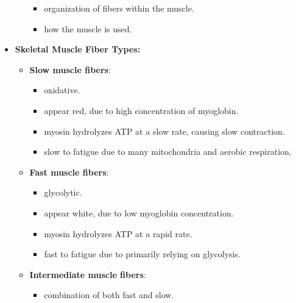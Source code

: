 \documentclass[12pt,a4paper]{article}
\begin{document}
\begin{itemize}
\begin{itemize}
\begin{itemize}
                        \item organization of fibers within the muscle.
                        \item how the muscle is used.
                    \end{itemize}
            \end{itemize}
        \item \textbf{Skeletal Muscle Fiber Types:}
            \begin{itemize}
                \item \textbf{Slow muscle fibers}:
                    \begin{itemize}
                        \item oxidative.
                        \item appear red, due to high concentration of myoglobin.
                        \item myosin hydrolyzes ATP at a slow rate, causing slow contraction.
                        \item slow to fatigue due to many mitochondria and aerobic respiration.
                    \end{itemize} 
                \item \textbf{Fast muscle fibers}:
                    \begin{itemize}
                        \item glycolytic.
                        \item appear white, due to low myoglobin concentration.
                        \item myosin hydrolyzes ATP at a rapid rate.
                        \item fast to fatigue due to primarily relying on glycolysis.
                    \end{itemize}
                \item \textbf{Intermediate muscle fibers}:
                    \begin{itemize}
                        \item combination of both fast and slow.
                    \end{itemize}
            \end{itemize}
        
\end{itemize}


\clearpage
\end{document}
